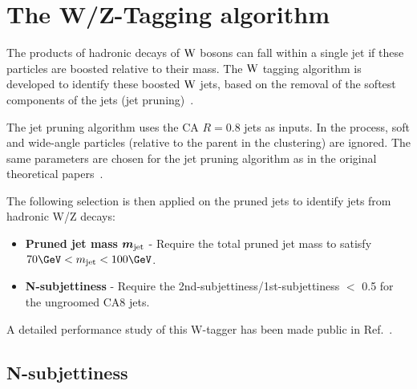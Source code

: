 \section{The W/Z-Tagging algorithm}
\label{sec: W/Z tagging}

The products of hadronic decays of ${\mathrm{W}}$ bosons can
fall within a single jet if these particles are boosted relative to
their mass.  The ${\mathrm{W}}$ tagging algorithm is developed to
identify these boosted ${\mathrm{W}}$ jets, based on the removal of the softest
components of the jets (jet pruning)~\cite{catop_cms,topwtag_pas}.

The jet pruning algorithm uses the CA $R=0.8$ jets
as inputs. In the process, soft and
wide-angle particles (relative to the parent in the clustering) are
ignored.  The same parameters are chosen for the jet pruning algorithm
as in the original theoretical papers~\cite{jetpruning1,jetpruning2}.

The following selection is then applied on the pruned jets
to identify jets from hadronic W/Z decays:

\begin{itemize}

\item {\bf Pruned jet mass}  $\mbox{\boldmath$m_{\text{jet}}$}$
  - Require the total pruned jet mass to satisfy $70 \GeVcc < m_\text{jet} <  100 \GeVcc $.

\item {\bf N-subjettiness} 
  - Require the 2nd-subjettiness/1st-subjettiness $<$ 0.5 for the ungroomed CA8 jets. 
\end{itemize}

A detailed performance study of this W-tagger has been made public in Ref.~\cite{JME-13-006}.

\subsection{N-subjettiness}
\label{sec:N-subjettiness}

